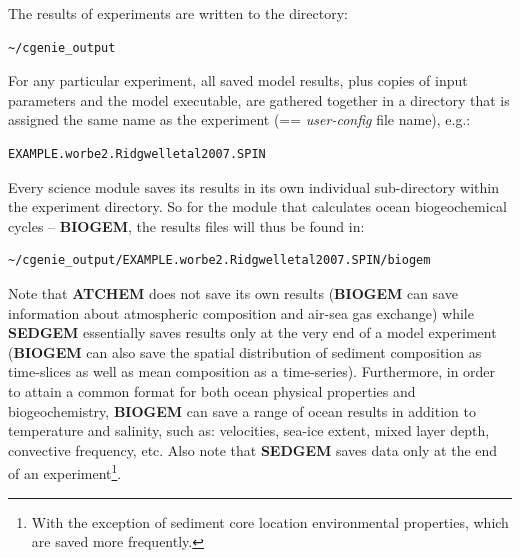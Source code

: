 \documentclass[11pt,fleqn]{book} %
\begin{document}
The results of experiments are written to the directory:
\begin{verbatim}~/cgenie_output\end{verbatim}
For any particular experiment, all saved model results, plus copies of input parameters and the model executable, are gathered together in a directory that is assigned the same name as the experiment (== \textit{user-config} file name), e.g.:
\begin{verbatim}EXAMPLE.worbe2.Ridgwelletal2007.SPIN\end{verbatim}
Every science module saves its results in its own individual sub-directory within the experiment directory. So for the module that calculates ocean biogeochemical cycles -- \textbf{BIOGEM}, the results files will thus be found in:
\begin{verbatim}~/cgenie_output/EXAMPLE.worbe2.Ridgwelletal2007.SPIN/biogem\end{verbatim}
Note that \textbf{ATCHEM} does not save its own results (\textbf{BIOGEM} can save information about atmospheric composition and air-sea gas exchange) while \textbf{SEDGEM} essentially saves results only at the very end of a model experiment (\textbf{BIOGEM} can also save the spatial distribution of sediment composition as time-slices as well as mean composition as a time-series). Furthermore, in order to attain a common format for both ocean physical properties and biogeochemistry, \textbf{BIOGEM} can save a range of ocean results in addition to temperature and salinity, such as: velocities, sea-ice extent, mixed layer depth, convective frequency, etc. Also note that \textbf{SEDGEM} saves data only at the end of an experiment\footnote{With the exception of sediment core location environmental properties, which are saved more frequently.}.
\end{document}
